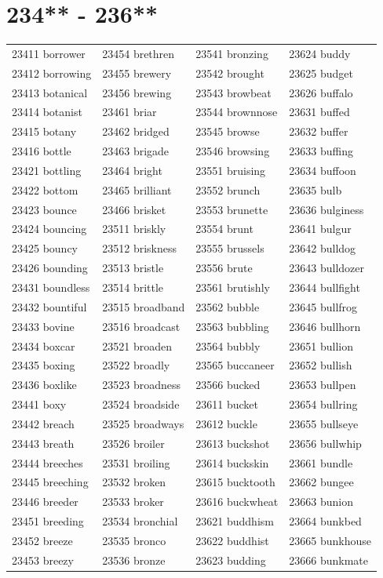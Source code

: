 \documentclass[10pt, oneside]{book}
\begin{document}
\begin{table}
	\centering
	\section*{234** - 236**}
	\begin{tabular}{l l l l}
23411 borrower &23454 brethren &23541 bronzing &23624 buddy\\
23412 borrowing &23455 brewery &23542 brought &23625 budget\\
23413 botanical &23456 brewing &23543 browbeat &23626 buffalo\\
23414 botanist &23461 briar &23544 brownnose &23631 buffed\\
23415 botany &23462 bridged &23545 browse &23632 buffer\\
23416 bottle &23463 brigade &23546 browsing &23633 buffing\\
23421 bottling &23464 bright &23551 bruising &23634 buffoon\\
23422 bottom &23465 brilliant &23552 brunch &23635 bulb\\
23423 bounce &23466 brisket &23553 brunette &23636 bulginess\\
23424 bouncing &23511 briskly &23554 brunt &23641 bulgur\\
23425 bouncy &23512 briskness &23555 brussels &23642 bulldog\\
23426 bounding &23513 bristle &23556 brute &23643 bulldozer\\
23431 boundless &23514 brittle &23561 brutishly &23644 bullfight\\
23432 bountiful &23515 broadband &23562 bubble &23645 bullfrog\\
23433 bovine &23516 broadcast &23563 bubbling &23646 bullhorn\\
23434 boxcar &23521 broaden &23564 bubbly &23651 bullion\\
23435 boxing &23522 broadly &23565 buccaneer &23652 bullish\\
23436 boxlike &23523 broadness &23566 bucked &23653 bullpen\\
23441 boxy &23524 broadside &23611 bucket &23654 bullring\\
23442 breach &23525 broadways &23612 buckle &23655 bullseye\\
23443 breath &23526 broiler &23613 buckshot &23656 bullwhip\\
23444 breeches &23531 broiling &23614 buckskin &23661 bundle\\
23445 breeching &23532 broken &23615 bucktooth &23662 bungee\\
23446 breeder &23533 broker &23616 buckwheat &23663 bunion\\
23451 breeding &23534 bronchial &23621 buddhism &23664 bunkbed\\
23452 breeze &23535 bronco &23622 buddhist &23665 bunkhouse\\
23453 breezy &23536 bronze &23623 budding &23666 bunkmate\\
	\end{tabular}
 \end{table}
\clearpage
\end{document}
